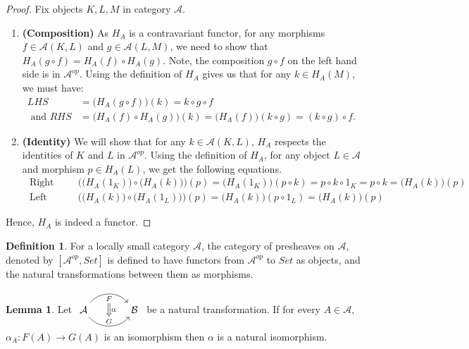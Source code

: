 \documentclass[a4paper]{article}
\theoremstyle{definition}
\newtheorem{definition}[theorem]{Definition}
\newtheorem{lemma}[theorem]{Lemma}
\begin{document}
\begin{proof}\setcounter{equation}{0}
	Fix objects $K,L,M$ in category $\mathcal{A}$.
	\begin{enumerate}[label=\Roman*]
		\item \textbf{ (Composition) } As $H_A$ is a contravariant functor, for
			any morphisms $f\in \mathcal{A} (K,L)$ and $g \in
			\mathcal{A}(L,M)$, we need to show that
			$H_A(g \circ f)=H_A(f) \circ H_A(g)$. Note,
			the composition $g\circ f$ on the left hand side is in $\mathcal{A} ^{op}$.
			Using the definition of $H_A$ gives us that for any $k \in H_A(M) $, we must have:
			\begin{align*}
				LHS&=\Big( H_A(g \circ f) \Big) (k)=k\circ g\circ f \\
				\text{ and } RHS&=\Big( H_A(f)\circ H_A(g) \Big) (k)=\Big( H_A(f) \Big) (k \circ g)
			=(k\circ g)\circ f. \end{align*}
		\item \textbf{ (Identity) } We will show that for any
			$k \in \mathcal{A} (K,L)$, $H_A$ respects the identities
			of $K$ and $L$ in $\mathcal{A}^{op}$. Using the definition of $H_A$,
			for any object $L\in \mathcal{A} $ and
			morphism $p \in H_A(L)$, we get the following equations.
			\begin{align*}
				\text{ Right Identity: }& \Big( \big( H_A(1_K) \big) \circ \big( H_A(k) \big) \Big)(p)
				=\big( H_A(1_K) \big) (p \circ k) = p \circ k \circ 1_K=p \circ k = \big( H_A(k) \big)(p)\\
				\text{ Left Identity: }& \Big( \big( H_A(k) \big) \circ \big( H_A(1_L) \big) \Big)(p)
				=\big( H_A(k) \big) (p \circ 1_L) = \big( H_A(k) \big) (p)
			\end{align*}

		\end{enumerate}
		Hence, $H_A$ is indeed a functor.
	\end{proof}
	\begin{definition} %
		For a locally small category $\mathcal{A} $, the category of presheaves on $\mathcal{A} $, denoted by $[\mathcal{A} ^{op},Set]$
		is defined to have functors from $\mathcal{A} ^{op}$ to $Set$ as objects,
		and the natural transformations between them as morphisms.
	\end{definition}
	\begin{lemma}
		Let $ 	\begin{tikzcd}[row sep=small, column sep=large]
			\mathcal{A}  \arrow[r,bend left=50, "F"{name=U, below}]
			\arrow[r, bend right = 50, "G"{name=D, above}]
		& \mathcal{B}
		\arrow[Rightarrow, from=U , to=D, "\alpha"]
		\end{tikzcd}$
		be a natural transformation. If for every $A \in \mathcal{A} $,
		$\alpha_A:F(A) \to G(A)$ is an isomorphism
		then $\alpha$ is a natural isomorphism.
	\end{lemma}
\end{document}

